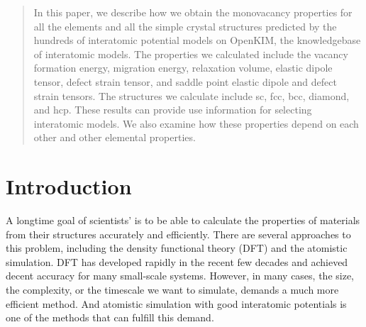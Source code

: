 \documentclass[%
 reprint,
 nofootinbib,
 amsmath,amssymb,
 aps,
]{revtex4-1}
\begin{document}
\begin{abstract}
In this paper, we describe how we obtain the monovacancy properties for all the elements and all the simple crystal structures predicted by the hundreds of interatomic potential models on OpenKIM, the knowledgebase of interatomic models.
The properties we calculated include the vacancy formation energy, migration energy, relaxation volume, elastic dipole tensor, defect strain tensor, and saddle point elastic dipole and defect strain tensors.
The structures we calculate include sc, fcc, bcc, diamond, and hcp.
These results can provide use information for selecting interatomic models.
We also examine how these properties depend on each other and other elemental properties.

\end{abstract}

\maketitle


\section{\label{sec:intro}Introduction}

A longtime goal of scientists' is to be able to calculate the properties of materials from their structures accurately and efficiently.
There are several approaches to this problem, including the density functional theory (DFT) and the atomistic simulation.
DFT has developed rapidly in the recent few decades and achieved decent accuracy for many small-scale systems.
However, in many cases, the size, the complexity, or the timescale we want to simulate, demands a much more efficient method.
And atomistic simulation with good interatomic potentials is one of the methods that can fulfill this demand.
\end{document}
